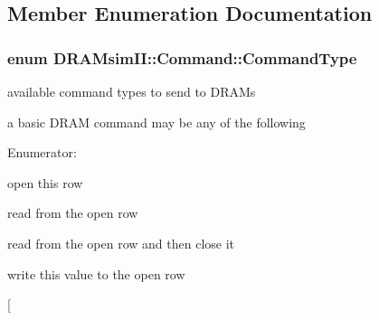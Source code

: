 \subsection{Member Enumeration Documentation}
\subsubsection[{CommandType}]{\setlength{\rightskip}{0pt plus 5cm}enum {\bf DRAMsimII::Command::CommandType}}\label{class_d_r_a_msim_i_i_1_1_command_a6da0b8d60d4902551918e57f30350e92}


available command types to send to DRAMs 

a basic DRAM command may be any of the following \begin{Desc}
\item[Enumerator: ]\par
\begin{description}
\item[{\em 
ACTIVATE\label{class_d_r_a_msim_i_i_1_1_command_a6da0b8d60d4902551918e57f30350e92ac037d54eecb9aa7670925e981caa7ddc}
}]open this row \item[{\em 
READ\label{class_d_r_a_msim_i_i_1_1_command_a6da0b8d60d4902551918e57f30350e92a9e5469e5ec116bbeef43a086f9949300}
}]read from the open row \item[{\em 
READ\_\-AND\_\-PRECHARGE\label{class_d_r_a_msim_i_i_1_1_command_a6da0b8d60d4902551918e57f30350e92ad8cde859482d4a3e0867ce05fd4a05e4}
}]read from the open row and then close it \item[{\em 
WRITE\label{class_d_r_a_msim_i_i_1_1_command_a6da0b8d60d4902551918e57f30350e92a19f82df1d946ff2568adbd62fc49ebcc}
}]write this value to the open row \item[{\em 
}
\end{description}
\end{Desc}
